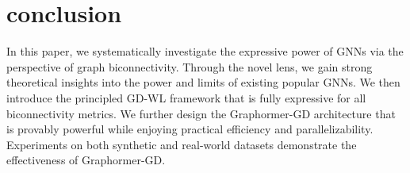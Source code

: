 \documentclass{article} %
\begin{document}
    
    





\section{conclusion}
In this paper, we systematically investigate the expressive power of GNNs via the perspective of graph biconnectivity.
Through the novel lens, we gain strong theoretical insights into the power and limits of existing popular GNNs. We then introduce the principled GD-WL framework that is fully expressive for all biconnectivity metrics.
We further design the Graphormer-GD architecture that is provably powerful while enjoying practical efficiency and parallelizability. Experiments on both synthetic and real-world datasets demonstrate the effectiveness of Graphormer-GD.
\end{document}
